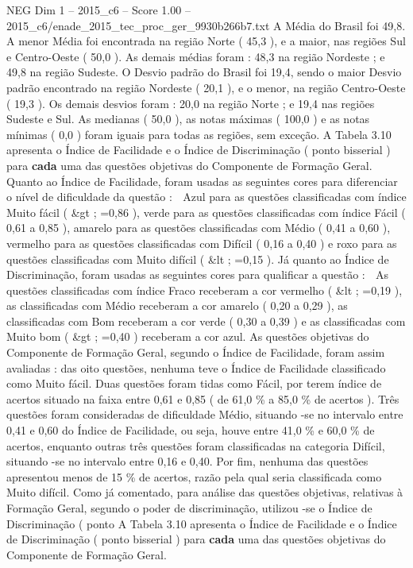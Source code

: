 \begin{textsample}{NEG Dim 1 – 2015\_c6 – Score 1.00 – 2015\_c6/enade\_2015\_tec\_proc\_ger\_9930b266b7.txt}
A Média do Brasil foi 49,8.
A menor Média foi encontrada na região Norte ( 45,3 ), e a maior, nas regiões Sul e Centro-Oeste ( 50,0 ).
As demais médias foram : 48,3 na região Nordeste ; e 49,8 na região Sudeste.
O Desvio padrão do Brasil foi 19,4, sendo o maior Desvio padrão encontrado na região Nordeste ( 20,1 ), e o menor, na região Centro-Oeste ( 19,3 ).
Os demais desvios foram : 20,0 na região Norte ; e 19,4 nas regiões Sudeste e Sul.
As medianas ( 50,0 ), as notas máximas ( 100,0 ) e as notas mínimas ( 0,0 ) foram iguais para todas as regiões, sem exceção.
A Tabela 3.10 apresenta o Índice de Facilidade e o Índice de Discriminação ( ponto bisserial ) para \textbf{cada} uma das questões objetivas do Componente de Formação Geral.
Quanto ao Índice de Facilidade, foram usadas as seguintes cores para diferenciar o nível de dificuldade da questão :  Azul para as questões classificadas com índice Muito fácil ( \&gt ; =0,86 ), verde para as questões classificadas com índice Fácil ( 0,61 a 0,85 ), amarelo para as questões classificadas com Médio ( 0,41 a 0,60 ), vermelho para as questões classificadas com Difícil ( 0,16 a 0,40 ) e roxo para as questões classificadas com Muito difícil ( \&lt ; =0,15 ).
Já quanto ao Índice de Discriminação, foram usadas as seguintes cores para qualificar a questão :  As questões classificadas com índice Fraco receberam a cor vermelho ( \&lt ; =0,19 ), as classificadas com Médio receberam a cor amarelo ( 0,20 a 0,29 ), as classificadas com Bom receberam a cor verde ( 0,30 a 0,39 ) e as classificadas com Muito bom ( \&gt ; =0,40 ) receberam a cor azul.
As questões objetivas do Componente de Formação Geral, segundo o Índice de Facilidade, foram assim avaliadas : das oito questões, nenhuma teve o Índice de Facilidade classificado como Muito fácil.
Duas questões foram tidas como Fácil, por terem índice de acertos situado na faixa entre 0,61 e 0,85 ( de 61,0 \% a 85,0 \% de acertos ).
Três questões foram consideradas de dificuldade Médio, situando -se no intervalo entre 0,41 e 0,60 do Índice de Facilidade, ou seja, houve entre 41,0 \% e 60,0 \% de acertos, enquanto outras três questões foram classificadas na categoria Difícil, situando -se no intervalo entre 0,16 e 0,40.
Por fim, nenhuma das questões apresentou menos de 15 \% de acertos, razão pela qual seria classificada como Muito difícil.
Como já comentado, para análise das questões objetivas, relativas à Formação Geral, segundo o poder de discriminação, utilizou -se o Índice de Discriminação ( ponto A Tabela 3.10 apresenta o Índice de Facilidade e o Índice de Discriminação ( ponto bisserial ) para \textbf{cada} uma das questões objetivas do Componente de Formação Geral.

\end{textsample}
